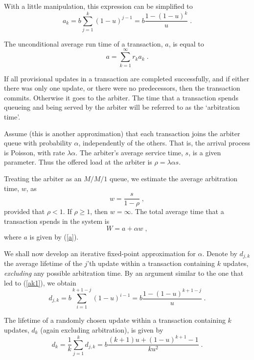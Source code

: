 \documentclass[runningheads]{llncs}
\begin{document}
With a little manipulation, this expression can be simplified to
\begin{equation} \label{ak1}
a_k = b\sum_{j=1}^k (1-u)^{j-1} = b\frac{1 - (1-u)^k}{u}\;.
\end{equation}

The unconditional average run time of a transaction, $a$, is equal to
\begin{equation} \label{a}
a = \sum_{k=1}^\infty r_ka_k\;.
\end{equation}

If all provisional updates in a transaction are completed successfully, and if
either there was only one update, or there were no predecessors, then the
transaction commits. Otherwise it goes to the arbiter. The time that a transaction
spends queueing and being served by the arbiter will be referred to as the
`arbitration time'.

Assume (this is another approximation) that each transaction joins the arbiter
queue with probability $\alpha$, independently of the others. That is, the arrival
process is Poisson, with rate $\lambda\alpha$. The arbiter's average service time,
$s$, is a given parameter. Thus the offered load at the arbiter is
$\rho = \lambda\alpha s$.

Treating the arbiter as an $M/M/1$ queue, we estimate the average arbitration time,
$w$, as
\begin{equation} \label{w}
w = \frac{s}{1 - \rho}\;,
\end{equation}
provided that $\rho<1$. If $\rho\geq 1$, then $w =\infty$.
The total average time that a transaction spends in the system is
\begin{equation} \label{W}
W = a + \alpha w\;,
\end{equation}
where $a$ is given by (\ref{a}).

We shall now develop an iterative fixed-point approximation for $\alpha$. Denote
by $d_{j,k}$ the average lifetime of the $j$'th update within a transaction
containing $k$ updates, {\em excluding} any possible arbitration time. By an
argument similar to the one that led to (\ref{ak1}), we obtain
\begin{equation} \label{djk}
d_{j,k} = b\sum_{i=1}^{k+1-j} (1-u)^{i-1} = b\frac{1 - (1-u)^{k+1-j}}{u}\;.
\end{equation}

The lifetime of a randomly chosen update within a transaction containing $k$
updates, $d_k$ (again excluding arbitration), is given by
\begin{equation} \label{dk}
d_k = \frac{1}{k}\sum_{j=1}^k d_{j,k} =
b\frac{(k+1)u + (1-u)^{k+1} -1}{ku^2}\;.
\end{equation}
\end{document}
